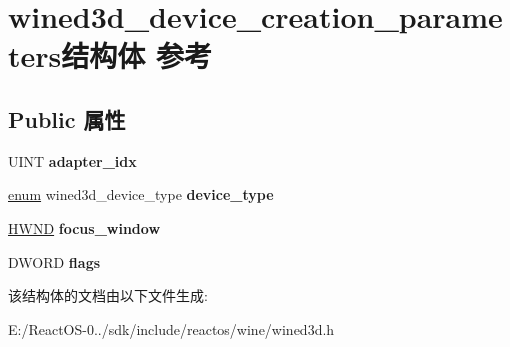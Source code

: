 \hypertarget{structwined3d__device__creation__parameters}{}\section{wined3d\+\_\+device\+\_\+creation\+\_\+parameters结构体 参考}
\label{structwined3d__device__creation__parameters}
\subsection*{Public 属性}
\begin{DoxyCompactItemize}
\item 
\mbox{\label{structwined3d__device__creation__parameters_a83cf09abc292c37f6da2e64addbeda54}} 
U\+I\+NT {\bfseries adapter\+\_\+idx}
\item 
\mbox{\label{structwined3d__device__creation__parameters_a4e848e911bbf695df395600cb526e34a}} 
\hyperlink{interfaceenum}{enum} wined3d\+\_\+device\+\_\+type {\bfseries device\+\_\+type}
\item 
\mbox{\label{structwined3d__device__creation__parameters_a320f8b3c713dfb1306fa9b07eda65f5c}} 
\hyperlink{interfacevoid}{H\+W\+ND} {\bfseries focus\+\_\+window}
\item 
\mbox{\label{structwined3d__device__creation__parameters_a96433f7598cd01bb715c6ce712bf355f}} 
D\+W\+O\+RD {\bfseries flags}
\end{DoxyCompactItemize}


该结构体的文档由以下文件生成\+:\begin{DoxyCompactItemize}
\item 
E\+:/\+React\+O\+S-\/0../sdk/include/reactos/wine/wined3d.\+h\end{DoxyCompactItemize}
